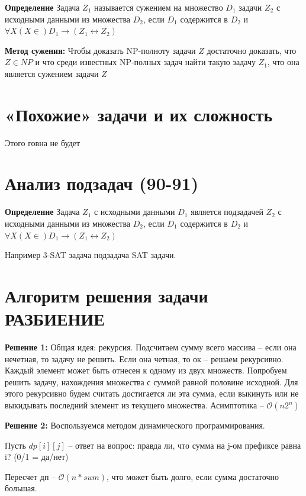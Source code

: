 \documentclass[40pt]{article}
\begin{document}
\par \textbf{Определение} Задача $Z_1$ называется сужением на множество $D_1$ задачи $Z_2$ с исходными данными из множества $D_2$, если $D_1$ содержится в $D_2$ и $\forall X(X\in) D_1 \rightarrow (Z_1 \leftrightarrow Z_2)$ 
 
	\par \textbf{Метод сужения:} Чтобы доказать NP-полноту задачи $Z$ достаточно доказать, что $Z \in NP$ и что среди известных NP-полных задач найти такую задачу $Z_1$, что она является сужением задачи $Z$
	
\section{«Похожие» задачи и их сложность}

Этого говна не будет

\section{Анализ подзадач (90-91)}

\par \textbf{Определение} Задача $Z_1$ с исходными данными $D_1$ является подзадачей $Z_2$ с исходными данными из множества $D_2$, если $D_1$ содержится в $D_2$ и $\forall X(X\in) D_1 \rightarrow (Z_1 \leftrightarrow Z_2)$ 
 
     \par Например 3-SAT задача подзадача SAT задачи.
     
\section{Алгоритм решения задачи РАЗБИЕНИЕ}

\par \textbf{Решение 1:} Общая идея: рекурсия. Подсчитаем сумму всего массива -- если она нечетная, то задачу не решить. Если она четная, то ок -- решаем рекурсивно. Каждый элемент может быть отнесен к одному из двух множеств. Попробуем решить задачу, нахождения множества с суммой равной половине исходной. Для этого рекурсивно будем считать достигается ли эта сумма, если выкинуть или не выкидывать последний элемент из текущего множества. Асимптотика -- $\mathcal O(n2^n)$
    \par \textbf{Решение 2:} Воспользуемся методом динамического программирования. 
    \par Пусть $dp[i][j]$ -- ответ на вопрос: правда ли, что сумма на j-ом префиксе равна i? (0/1 = да/нет)
    \par Пересчет дп -- $\mathcal O(n*sum )$, что может быть долго, если сумма достаточно большая.
\end{document}

